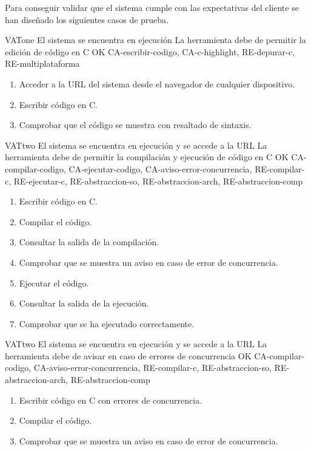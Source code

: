Para conseguir validar que el sistema cumple con las expectativas del cliente se han diseñado los siguientes casos de prueba.

\begin{testCase}{VAT}{one}
    {El sistema se encuentra en ejecución}
    {\NA}
    {La herramienta debe de permitir la edición de código en C}
    {OK}
    {CA-escribir-codigo, CA-c-highlight, RE-depurar-c, RE-multiplataforma}
    \begin{enumerate}
        \item Acceder a la URL del sistema desde el navegador de cualquier dispositivo.
        \item Escribir código en C.
        \item Comprobar que el código se muestra con resaltado de sintaxis.
    \end{enumerate}
\end{testCase}

\begin{testCase}{VAT}{two}
    {El sistema se encuentra en ejecución y se accede a la URL}
    {\NA}
    {La herramienta debe de permitir la compilación y ejecución de código en C}
    {OK}
    {CA-compilar-codigo, CA-ejecutar-codigo, CA-aviso-error-concurrencia, RE-compilar-c, RE-ejecutar-c, RE-abstraccion-so, RE-abstraccion-arch, RE-abstraccion-comp}
    \begin{enumerate}
        \item Escribir código en C.
        \item Compilar el código.
        \item Consultar la salida de la compilación.
        \item Comprobar que se muestra un aviso en caso de error de concurrencia.
        \item Ejecutar el código.
        \item Consultar la salida de la ejecución.
        \item Comprobar que se ha ejecutado correctamente.
    \end{enumerate}
\end{testCase}

\begin{testCase}{VAT}{two}
    {El sistema se encuentra en ejecución y se accede a la URL}
    {\NA}
    {La herramienta debe de avisar en caso de errores de concurrencia}
    {OK}
    {CA-compilar-codigo, CA-aviso-error-concurrencia, RE-compilar-c, RE-abstraccion-so, RE-abstraccion-arch, RE-abstraccion-comp}
    \begin{enumerate}
        \item Escribir código en C con errores de concurrencia.
        \item Compilar el código.
        \item Comprobar que se muestra un aviso en caso de error de concurrencia.
    \end{enumerate}
\end{testCase}

